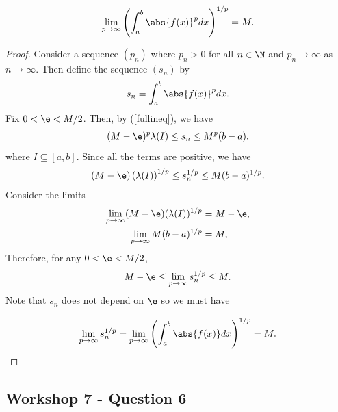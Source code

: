 \documentclass{article}
\begin{document}
\begin{claim*}
	\begin{align*}
		\lim_{p\to\infty} \left(\int_a^b \abs{f(x)}^p dx\right)^{1/p} = M.
	\end{align*}
\end{claim*}
\begin{proof}
	Consider a sequence $(p_n)$ where $p_n>0$ for all $n\in\N$ and
	$p_n\to\infty$ as $n\to\infty$. Then define the sequence $(s_n)$ by
	\begin{align*}
		s_n = \int_a^b \abs{f(x)}^pdx.
	\end{align*}
	Fix $0<\e<M/2$. Then, by (\ref{fullineq}), we have
	\begin{align*}
		(M-\e)^p\lambda(I) \leq s_n \leq M^p(b-a).
	\end{align*}
	where $I\subseteq [a,b]$. Since all the terms are positive, we have
	\begin{align*}
		(M-\e)\left(\lambda(I)\right)^{1/p} \leq
		s_n^{1/p} \leq
		M(b-a)^{1/p}.
	\end{align*}
	Consider the limits
	\begin{align*}
		\lim_{p\to\infty} (M-\e)(\lambda(I))^{1/p} & = M-\e, \\
		\lim_{p\to\infty} M(b-a)^{1/p}             & = M,    \\
	\end{align*}
	Therefore, for any $0<\e<M/2$,
	\begin{align*}
		M-\e \leq \lim_{p\to\infty} s_n^{1/p} \leq M.
	\end{align*}
	Note that $s_n$ does not depend on $\e$ so we must have

	\begin{align*}
		\lim_{p\to\infty} s_n^{1/p} = \lim_{p\to\infty} \left(\int_a^b \abs{f(x)}dx\right)^{1/p} = M.
	\end{align*}
\end{proof}

\subsection*{Workshop 7 - Question 6}
\end{document}
